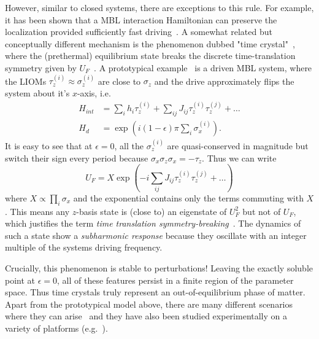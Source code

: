 However, similar to closed systems, there are exceptions to this rule.
For example, it has been shown that a MBL interaction Hamiltonian can preserve the localization provided sufficiently fast driving~\cite{abaninTheoryManybodyLocalization2016,burauFateAlgebraicManybody2021,sierantStabilityManybodyLocalization2023}. 
A somewhat related but conceptually different mechanism is the phenomenon dubbed "time crystal"~\cite{vonkeyserlingkAbsoluteStabilitySpatiotemporal2016,elsePrethermalPhasesMatter2017}, where the (prethermal) equilibrium state breaks the discrete time-translation symmetry given by $U_F$~\cite{khemaniBriefHistoryTime2019,elseDiscreteTimeCrystals2020a}. A prototypical example~\cite{elseFloquetTimeCrystals2016,elseDiscreteTimeCrystals2020a} is a driven MBL system, where the LIOMs $\tau_z^{(i)}\approx\sigma_z^{(i)}$ are close to $\sigma_z$ and the drive approximately flips the system about it's $x$-axis, i.e.
\begin{align}
	H_{int} &= \sum_i h_i \tau_z^{(i)} + \sum_{ij} J_{ij}\tau_z^{(i)}\tau_z^{(j)}+\ldots\\
	H_{d}&=\exp(i(1-\epsilon)\pi\sum_i \sigma_x^{(i)}).
\end{align}
It is easy to see that at $\epsilon=0$, all the $\sigma_z^{(i)}$ are quasi-conserved in magnitude but switch their sign every period because $\sigma_x \sigma_z \sigma_x = -\tau_z$. Thus we can write
\begin{equation}
	U_F = X\exp(-i\sum_{ij} J_{ij}\tau_z^{(i)}\tau_z^{(j)} + \ldots )
\end{equation}
where $X\propto\prod_i \sigma_x$ and the exponential contains only the terms commuting with $X$. This means any $z$-basis state is (close to) an eigenstate of $U_F^2$ but not of $U_F$, which justifies the term \emph{time translation symmetry-breaking}~\cite{elseFloquetTimeCrystals2016}. The dynamics of such a state show a \emph{subharmonic response} because they oscillate with an integer multiple of the systems driving frequency.

Crucially, this phenomenon is stable to perturbations! Leaving the exactly soluble point at $\epsilon=0$, all of these features persist in a finite region of the parameter space. Thus time crystals truly represent an out-of-equilibrium phase of matter. Apart from the prototypical model above, there are many different scenarios where they can arise~\cite{khemaniBriefHistoryTime2019,elseDiscreteTimeCrystals2020a} and they have also been studied experimentally on a variety of platforms (e.g.~\cite{choiObservationDiscreteTimecrystalline2017,miTimeCrystallineEigenstateOrder2021,ippolitiManybodyPhysicsNISQ2021,randallManybodyLocalizedDiscrete2021}).
	

